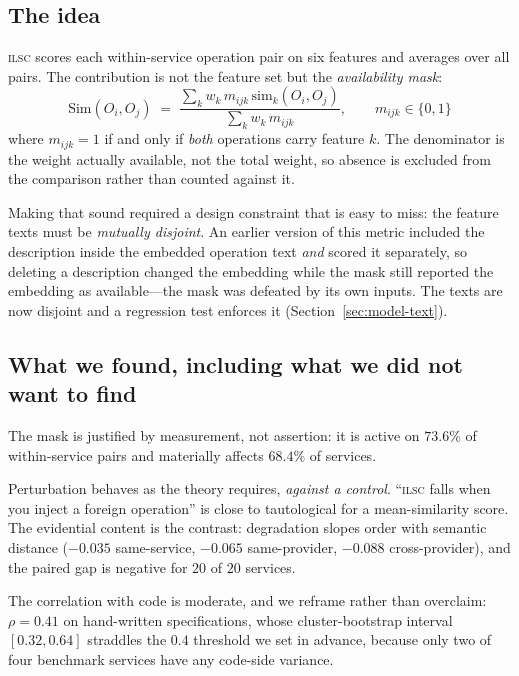 \documentclass[journal]{IEEEtran}
\newcommand{\ilsc}{\textsc{ilsc}}
\begin{document}
\subsection{The idea}
\ilsc{} scores each within-service operation pair on six features and averages
over all pairs. The contribution is not the feature set but the
\emph{availability mask}:
\begin{equation}
\mathrm{Sim}(O_i,O_j) \;=\;
\frac{\sum_k w_k \, m_{ijk} \, \mathrm{sim}_k(O_i,O_j)}
     {\sum_k w_k \, m_{ijk}},
\qquad
m_{ijk} \in \{0,1\}
\label{eq:mask-intro}
\end{equation}
where $m_{ijk}=1$ if and only if \emph{both} operations carry feature $k$. The
denominator is the weight actually available, not the total weight, so absence
is excluded from the comparison rather than counted against it.

Making that sound required a design constraint that is easy to miss: the feature
texts must be \emph{mutually disjoint}. An earlier version of this metric
included the description inside the embedded operation text \emph{and} scored it
separately, so deleting a description changed the embedding while the mask still
reported the embedding as available---the mask was defeated by its own inputs.
The texts are now disjoint and a regression test enforces it
(Section~\ref{sec:model-text}).

\subsection{What we found, including what we did not want to find}
The mask is justified by measurement, not assertion: it is active on $73.6\%$ of
within-service pairs and materially affects $68.4\%$ of services.

Perturbation behaves as the theory requires, \emph{against a control}. ``\ilsc{}
falls when you inject a foreign operation'' is close to tautological for a
mean-similarity score. The evidential content is the contrast: degradation
slopes order with semantic distance ($-0.035$ same-service, $-0.065$
same-provider, $-0.088$ cross-provider), and the paired gap is negative for
$20$ of $20$ services.

The correlation with code is moderate, and we reframe rather than overclaim:
$\rho=0.41$ on hand-written specifications, whose cluster-bootstrap interval
$[0.32,0.64]$ straddles the $0.4$ threshold we set in advance, because only two
of four benchmark services have any code-side variance.
\end{document}
